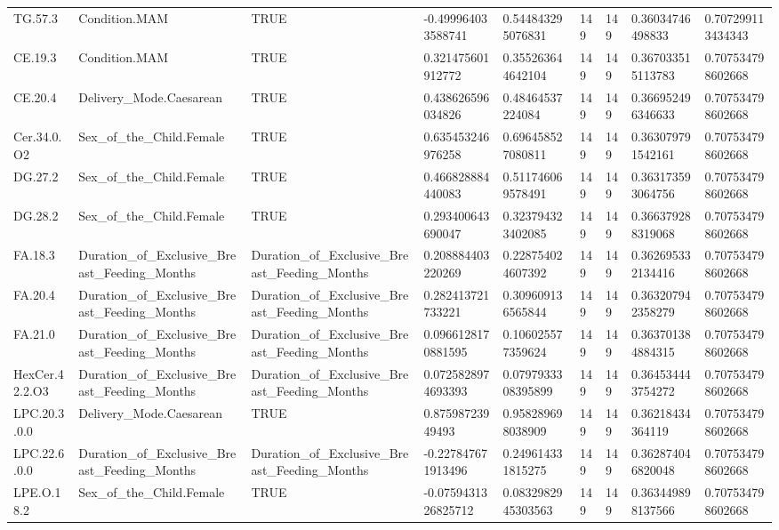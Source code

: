 \begin{longtable}{lllllllll}
TG.57.3 & Condition.MAM & TRUE & -0.499964033588741 & 0.544843295076831 & 149 & 149 & 0.36034746498833 & 0.707299113434343 \\
CE.19.3 & Condition.MAM & TRUE & 0.321475601912772 & 0.355263644642104 & 149 & 149 & 0.367033515113783 & 0.707534798602668 \\
CE.20.4 & Delivery\_Mode.Caesarean & TRUE & 0.438626596034826 & 0.48464537224084 & 149 & 149 & 0.366952496346633 & 0.707534798602668 \\
Cer.34.0.O2 & Sex\_of\_the\_Child.Female & TRUE & 0.635453246976258 & 0.696458527080811 & 149 & 149 & 0.363079791542161 & 0.707534798602668 \\
DG.27.2 & Sex\_of\_the\_Child.Female & TRUE & 0.466828884440083 & 0.511746069578491 & 149 & 149 & 0.363173593064756 & 0.707534798602668 \\
DG.28.2 & Sex\_of\_the\_Child.Female & TRUE & 0.293400643690047 & 0.323794323402085 & 149 & 149 & 0.366379288319068 & 0.707534798602668 \\
FA.18.3 & Duration\_of\_Exclusive\_Breast\_Feeding\_Months & Duration\_of\_Exclusive\_Breast\_Feeding\_Months & 0.208884403220269 & 0.228754024607392 & 149 & 149 & 0.362695332134416 & 0.707534798602668 \\
FA.20.4 & Duration\_of\_Exclusive\_Breast\_Feeding\_Months & Duration\_of\_Exclusive\_Breast\_Feeding\_Months & 0.282413721733221 & 0.309609136565844 & 149 & 149 & 0.363207942358279 & 0.707534798602668 \\
FA.21.0 & Duration\_of\_Exclusive\_Breast\_Feeding\_Months & Duration\_of\_Exclusive\_Breast\_Feeding\_Months & 0.0966128170881595 & 0.106025577359624 & 149 & 149 & 0.363701384884315 & 0.707534798602668 \\
HexCer.42.2.O3 & Duration\_of\_Exclusive\_Breast\_Feeding\_Months & Duration\_of\_Exclusive\_Breast\_Feeding\_Months & 0.0725828974693393 & 0.0797933308395899 & 149 & 149 & 0.364534443754272 & 0.707534798602668 \\
LPC.20.3.0.0 & Delivery\_Mode.Caesarean & TRUE & 0.87598723949493 & 0.958289698038909 & 149 & 149 & 0.36218434364119 & 0.707534798602668 \\
LPC.22.6.0.0 & Duration\_of\_Exclusive\_Breast\_Feeding\_Months & Duration\_of\_Exclusive\_Breast\_Feeding\_Months & -0.227847671913496 & 0.249614331815275 & 149 & 149 & 0.362874046820048 & 0.707534798602668 \\
LPE.O.18.2 & Sex\_of\_the\_Child.Female & TRUE & -0.0759431326825712 & 0.0832982945303563 & 149 & 149 & 0.363449898137566 & 0.707534798602668 \\

\end{longtable}
